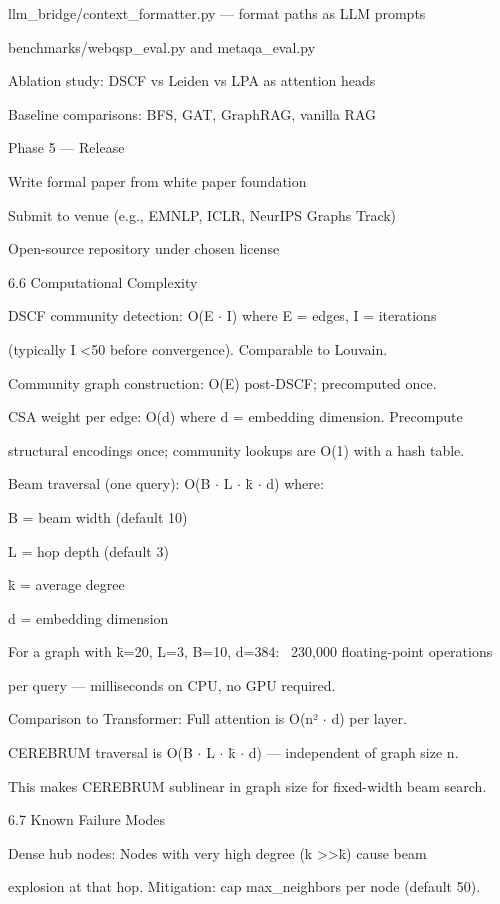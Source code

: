 \documentclass[10pt,journal,compsoc]{IEEEtran}
\begin{document}
llm\_bridge/context\_formatter.py — format paths as LLM prompts

benchmarks/webqsp\_eval.py and metaqa\_eval.py

Ablation study: DSCF vs Leiden vs LPA as attention heads

Baseline comparisons: BFS, GAT, GraphRAG, vanilla RAG

Phase 5 — Release

Write formal paper from white paper foundation

Submit to venue (e.g., EMNLP, ICLR, NeurIPS Graphs Track)

Open-source repository under chosen license

6.6 Comput\-ational Complexity

DSCF community detection: O(E $\cdot$ I) where E = edges, I = iterations

(typically I \textless  50 before convergence). Comparable to Louvain.

Community graph const\-ruction: O(E) post-DSCF; precomputed once.

CSA weight per edge: O(d) where d = embedding dimension. Precompute

structural encodings once; community lookups are O(1) with a hash table.

Beam traversal (one query): O(B $\cdot$ L $\cdot$ k̄ $\cdot$ d) where:

B = beam width (default 10)

L = hop depth (default 3)

k̄ = average degree

d = embedding dimension

For a graph with k̄=20, L=3, B=10, d=384: ~230,000 floating-point operations

per query — milli\-seconds on CPU, no GPU required.

Comparison to Transformer: Full attention is O(n² $\cdot$ d) per layer.

CEREBRUM traversal is O(B $\cdot$ L $\cdot$ k̄ $\cdot$ d) — independent of graph size n.

This makes CEREBRUM sublinear in graph size for fixed-width beam search.

6.7 Known Failure Modes

Dense hub nodes: Nodes with very high degree (k \textgreater \textgreater  k̄) cause beam

explosion at that hop. Mitigation: cap max\_neighbors per node (default 50).
\end{document}
